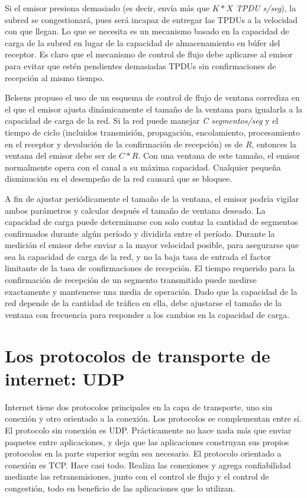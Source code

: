 \documentclass[10pt,a4paper]{report}
\begin{document}
	\par Si el emisor presiona demasiado (es decir, envía más que \textit{$K * X $  TPDU s/seg}), la subred se congestionará, pues será incapaz de entregar las TPDUs a la velocidad con que llegan. Lo que se necesita es un mecanismo basado en la capacidad de carga de la subred en lugar de la capacidad de almacenamiento en búfer del receptor. Es claro que el mecanismo de control de flujo debe aplicarse al emisor para evitar que estén pendientes demasiadas TPDUs sin confirmaciones de recepción al mismo tiempo.

	\par Belsens propuso el uso de un esquema de control de flujo de ventana corrediza en el que el emisor ajusta dinámicamente el tamaño de la ventana para igualarla a la capacidad de carga de la red. Si la red puede manejar \textit{C segmentos/seg} y el tiempo de ciclo (incluidos transmisión, propagación, encolamiento, procesamiento en el receptor y devolución de la confirmación de recepción) es de \textit{R}, entonces la ventana del emisor debe ser de \textit{$C * R$}. Con una ventana de este tamaño, el emisor normalmente opera con el canal a su máxima capacidad. Cualquier pequeña disminución en el desempeño de la red causará que se bloquee.

	\par A fin de ajustar periódicamente el tamaño de la ventana, el emisor podría vigilar ambos parámetros y calcular después el tamaño de ventana deseado. La capacidad de carga puede determinarse con solo contar la cantidad de segmentos confirmados durante algún período y dividirla entre el período. Durante la medición el emisor debe enviar a la mayor velocidad posible, para asegurarse que sea la capacidad de carga de la red, y no la baja tasa de entrada el factor limitante de la tasa de confirmaciones de recepción. El tiempo requerido para la confirmación de recepción de un segmento transmitido puede medirse exactamente y mantenerse una media de operación. Dado que la capacidad de la red depende de la cantidad de tráfico en ella, debe ajustarse el tamaño de la ventana con frecuencia para responder a los cambios en la capacidad de carga.

\section{Los protocolos de transporte de internet: UDP}
	\par Internet tiene dos protocolos principales en la capa de transporte, uno sin conexión y otro orientado a la conexión. Los protocolos se complementan entre sí. El protocolo sin conexión es UDP. Prácticamente no hace nada más que enviar paquetes entre aplicaciones, y deja que las aplicaciones construyan sus propios protocolos en la parte superior según sea necesario. El protocolo orientado a conexión es TCP. Hace casi todo. Realiza las conexiones y agrega confiabilidad mediante las retransmisiones, junto con el control de flujo y el control de congestión, todo en beneficio de las aplicaciones que lo utilizan.
\end{document}
